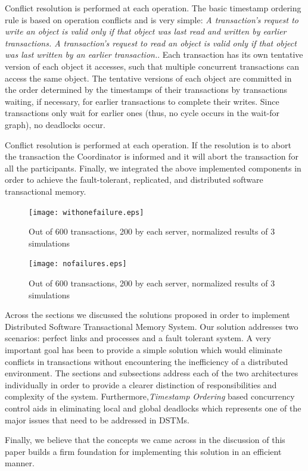 \documentclass[times, 10pt,twocolumn]{article}
\begin{document}
Conflict resolution is performed at each operation.
The basic timestamp ordering rule is based on operation conflicts and is very simple:
{\it A transaction’s request to write an object is valid only if that object was last read and written by earlier transactions. A transaction’s request to read an object is valid only if that object was
last written by an earlier transaction.}\cite{coulouris2005distributed}. Each transaction has its own tentative version of each object it accesses, such that multiple concurrent transactions can access the same object. The tentative versions of each object are committed in the order determined by the timestamps of their transactions by transactions waiting, if necessary, for earlier transactions to complete their writes.
Since transactions only wait for earlier ones (thus, no cycle occurs in the wait-for graph), no deadlocks occur.

Conflict resolution is performed at each operation. If the resolution is to abort the transaction the Coordinator is informed and it will abort the transaction for all the participants.
Finally, we integrated the above implemented components in order to achieve the fault-tolerant, 
replicated, and distributed software transactional memory.



\begin{figure}
\centering
\texttt{[image: withonefailure.eps]}
\caption{Out of 600 transactions, 200 by each server, normalized results of 3 simulations}
\label{fig:onef}
\end{figure}


\begin{figure}
\centering
\texttt{[image: nofailures.eps]}
\caption{Out of 600 transactions, 200 by each server, normalized results of 3 simulations}
\label{fig:noff}
\end{figure}


Across the sections we discussed the solutions proposed in order to implement Distributed Software Transactional Memory System.
Our solution addresses two scenarios: perfect links and processes and a fault tolerant system.
A very important goal has been to provide a simple solution which would eliminate conflicts in transactions without encountering the inefficiency of a distributed environment. 
The sections and subsections address each of the two architectures individually in order to provide a clearer distinction of responsibilities and complexity of the system.
Furthermore,{\it Timestamp Ordering} based concurrency control aids in eliminating local and global deadlocks which represents one of the major issues that need to be addressed in DSTMs.

Finally, we believe that the concepts we came across in the discussion of this paper builds a firm foundation for implementing this solution in an efficient manner.




\end{document}
